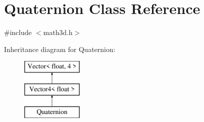 \hypertarget{class_quaternion}{}\section{Quaternion Class Reference}
\label{class_quaternion}


{\ttfamily \#include $<$math3d.\+h$>$}

Inheritance diagram for Quaternion\+:\begin{figure}[H]
\begin{center}
\leavevmode
\includegraphics[height=3.000000cm]{class_quaternion}
\end{center}
\end{figure}
